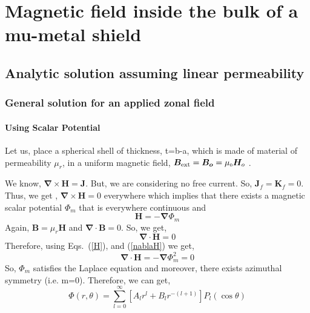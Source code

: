 
\chapter{Magnetic field inside the bulk of a mu-metal shield}
\section{Analytic solution assuming linear permeability}
\subsection{General solution for an applied zonal field}
\subsubsection{Using Scalar Potential}

Let us, place a spherical shell of thickness, t=b-a, which is made of material of permeability $\mu_r$, in a uniform magnetic field, \(\bm B_{\rm ext}=\bm{B_o}= \mu_{\scriptscriptstyle 0} \bm H_o\) \cite{jackson}.

We know, \(\bm{\nabla}\times\bm{H}=\bm{J}\). But, we are considering no free current. So, \(\bm{J}_f=\bm{K}_f=0\). Thus, we get , \(\bm{\nabla}\times\bm{H}=0\) everywhere which implies that there exists a magnetic scalar potential \(\Phi_m\) that is everywhere continuous and
\begin{equation}\label{H}
\bm{H}=-\bm{\nabla}\Phi_m
\end{equation} 
Again, \(\bm{B}=\mu_r\bm{H}\) and \(\bm{\nabla}\cdot\bm{B}=0\). So, we get,
\begin{equation}\label{nablaH}
\bm{\nabla}\cdot\bm{H}=0
\end{equation}
Therefore, using Eqs.~(\ref{H}), and (\ref{nablaH}) we get,
\begin{equation}
\bm{\nabla}\cdot\bm{H}=-\bm{\nabla}\Phi_m^2=0
\end{equation}
So, $\Phi_m$ satisfies the Laplace equation and moreover, there exists azimuthal symmetry (i.e. m=0). Therefore, we can get,
\begin{equation}
\Phi(r,\theta)=\sum_{l=0}^{\infty} [A_lr^l+B_lr^{-(l+1)}]P_l(\cos\theta)
\end{equation}

